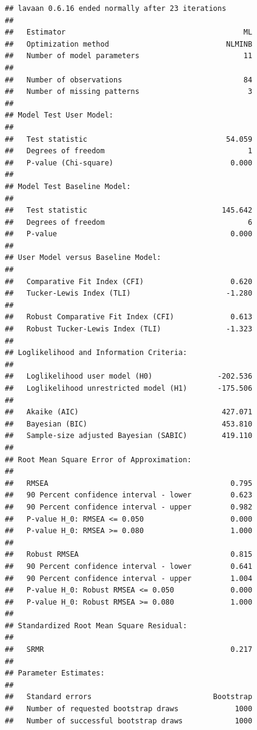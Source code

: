 \documentclass[
  11pt,
]{book}
\begin{document}
\begin{verbatim}
## lavaan 0.6.16 ended normally after 23 iterations
## 
##   Estimator                                         ML
##   Optimization method                           NLMINB
##   Number of model parameters                        11
## 
##   Number of observations                            84
##   Number of missing patterns                         3
## 
## Model Test User Model:
##                                                       
##   Test statistic                                54.059
##   Degrees of freedom                                 1
##   P-value (Chi-square)                           0.000
## 
## Model Test Baseline Model:
## 
##   Test statistic                               145.642
##   Degrees of freedom                                 6
##   P-value                                        0.000
## 
## User Model versus Baseline Model:
## 
##   Comparative Fit Index (CFI)                    0.620
##   Tucker-Lewis Index (TLI)                      -1.280
##                                                       
##   Robust Comparative Fit Index (CFI)             0.613
##   Robust Tucker-Lewis Index (TLI)               -1.323
## 
## Loglikelihood and Information Criteria:
## 
##   Loglikelihood user model (H0)               -202.536
##   Loglikelihood unrestricted model (H1)       -175.506
##                                                       
##   Akaike (AIC)                                 427.071
##   Bayesian (BIC)                               453.810
##   Sample-size adjusted Bayesian (SABIC)        419.110
## 
## Root Mean Square Error of Approximation:
## 
##   RMSEA                                          0.795
##   90 Percent confidence interval - lower         0.623
##   90 Percent confidence interval - upper         0.982
##   P-value H_0: RMSEA <= 0.050                    0.000
##   P-value H_0: RMSEA >= 0.080                    1.000
##                                                       
##   Robust RMSEA                                   0.815
##   90 Percent confidence interval - lower         0.641
##   90 Percent confidence interval - upper         1.004
##   P-value H_0: Robust RMSEA <= 0.050             0.000
##   P-value H_0: Robust RMSEA >= 0.080             1.000
## 
## Standardized Root Mean Square Residual:
## 
##   SRMR                                           0.217
## 
## Parameter Estimates:
## 
##   Standard errors                            Bootstrap
##   Number of requested bootstrap draws             1000
##   Number of successful bootstrap draws            1000

\end{verbatim}
\end{document}
